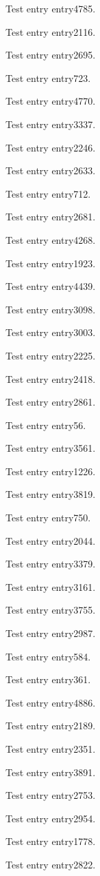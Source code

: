 Test entry \gls{entry4785}.

Test entry \gls{entry2116}.

Test entry \gls{entry2695}.

Test entry \gls{entry723}.

Test entry \gls{entry4770}.

Test entry \gls{entry3337}.

Test entry \gls{entry2246}.

Test entry \gls{entry2633}.

Test entry \gls{entry712}.

Test entry \gls{entry2681}.

Test entry \gls{entry4268}.

Test entry \gls{entry1923}.

Test entry \gls{entry4439}.

Test entry \gls{entry3098}.

Test entry \gls{entry3003}.

Test entry \gls{entry2225}.

Test entry \gls{entry2418}.

Test entry \gls{entry2861}.

Test entry \gls{entry56}.

Test entry \gls{entry3561}.

Test entry \gls{entry1226}.

Test entry \gls{entry3819}.

Test entry \gls{entry750}.

Test entry \gls{entry2044}.

Test entry \gls{entry3379}.

Test entry \gls{entry3161}.

Test entry \gls{entry3755}.

Test entry \gls{entry2987}.

Test entry \gls{entry584}.

Test entry \gls{entry361}.

Test entry \gls{entry4886}.

Test entry \gls{entry2189}.

Test entry \gls{entry2351}.

Test entry \gls{entry3891}.

Test entry \gls{entry2753}.

Test entry \gls{entry2954}.

Test entry \gls{entry1778}.

Test entry \gls{entry2822}.

